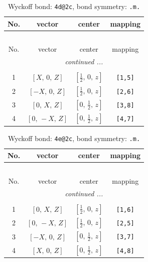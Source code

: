 \documentclass[fleqn,8pt]{jsarticle}
\begin{document}
\begin{longtable}{cccc}
\caption{Wyckoff bond: {\tt 4d@2c}, bond symmetry: {\tt .m.}}
 \\
 \hline \hline
No. & vector & center & mapping \\ \hline \endfirsthead

\multicolumn{3}{l}{\tablename\ \thetable{}} \\
 \hline \hline
No. & vector & center & mapping \\ \hline \endhead

 \hline \hline
\multicolumn{3}{r}{\footnotesize\it continued ...} \\ \endfoot

 \hline \hline
\multicolumn{3}{r}{} \\ \endlastfoot

1 & $\left[ X,\, 0,\, Z \right]$ & $\left[ \frac{1}{2},\, 0,\, z \right]$ & {\tt [1,5]} \\ \hline
2 & $\left[ - X,\, 0,\, Z \right]$ & $\left[ \frac{1}{2},\, 0,\, z \right]$ & {\tt [2,6]} \\ \hline
3 & $\left[ 0,\, X,\, Z \right]$ & $\left[ 0,\, \frac{1}{2},\, z \right]$ & {\tt [3,8]} \\ \hline
4 & $\left[ 0,\, - X,\, Z \right]$ & $\left[ 0,\, \frac{1}{2},\, z \right]$ & {\tt [4,7]} \\
\end{longtable}
\renewcommand{\arraystretch}{1.2}
\begin{longtable}{cccc}
\caption{Wyckoff bond: {\tt 4e@2c}, bond symmetry: {\tt .m.}}
 \\
 \hline \hline
No. & vector & center & mapping \\ \hline \endfirsthead

\multicolumn{3}{l}{\tablename\ \thetable{}} \\
 \hline \hline
No. & vector & center & mapping \\ \hline \endhead

 \hline \hline
\multicolumn{3}{r}{\footnotesize\it continued ...} \\ \endfoot

 \hline \hline
\multicolumn{3}{r}{} \\ \endlastfoot

1 & $\left[ 0,\, X,\, Z \right]$ & $\left[ \frac{1}{2},\, 0,\, z \right]$ & {\tt [1,6]} \\ \hline
2 & $\left[ 0,\, - X,\, Z \right]$ & $\left[ \frac{1}{2},\, 0,\, z \right]$ & {\tt [2,5]} \\ \hline
3 & $\left[ - X,\, 0,\, Z \right]$ & $\left[ 0,\, \frac{1}{2},\, z \right]$ & {\tt [3,7]} \\ \hline
4 & $\left[ X,\, 0,\, Z \right]$ & $\left[ 0,\, \frac{1}{2},\, z \right]$ & {\tt [4,8]} \\
\end{longtable}
\end{document}
